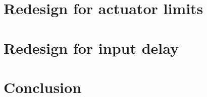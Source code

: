 \documentclass{article}
\begin{document}
\section{Redesign for actuator limits}

\clearpage

\section{Redesign for input delay}

\clearpage

\section*{Conclusion}

\clearpage

\printbibliography
\cleardoublepage

\end{document}
